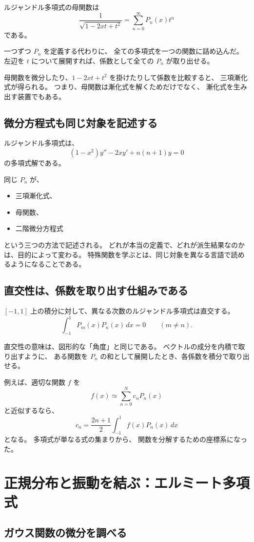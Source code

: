 ルジャンドル多項式の母関数は
\[
  \frac1{\sqrt{1-2xt+t^2}}
  =\sum_{n=0}^{\infty}P_n(x)t^n
\]
である。

一つずつ $P_n$ を定義する代わりに、
全ての多項式を一つの関数に詰め込んだ。
左辺を $t$ について展開すれば、係数として全ての $P_n$ が取り出せる。

母関数を微分したり、$1-2xt+t^2$ を掛けたりして係数を比較すると、
三項漸化式が得られる。
つまり、母関数は漸化式を解くためだけでなく、
漸化式を生み出す装置でもある。

\subsection{微分方程式も同じ対象を記述する}

ルジャンドル多項式は、
\[
  (1-x^2)y''-2xy'+n(n+1)y=0
\]
の多項式解である。

同じ $P_n$ が、
\begin{itemize}
  \item 三項漸化式、
  \item 母関数、
  \item 二階微分方程式
\end{itemize}
という三つの方法で記述される。
どれが本当の定義で、どれが派生結果なのかは、目的によって変わる。
特殊関数を学ぶとは、同じ対象を異なる言語で読めるようになることである。

\subsection{直交性は、係数を取り出す仕組みである}

$[-1,1]$ 上の積分に対して、異なる次数のルジャンドル多項式は直交する。
\[
  \int_{-1}^{1}P_m(x)P_n(x)\,dx=0
  \qquad(m\neq n).
\]

直交性の意味は、図形的な「角度」と同じである。
ベクトルの成分を内積で取り出すように、
ある関数を $P_n$ の和として展開したとき、各係数を積分で取り出せる。

例えば、適切な関数 $f$ を
\[
  f(x)\simeq\sum_{n=0}^{N}c_nP_n(x)
\]
と近似するなら、
\[
  c_n=
  \frac{2n+1}{2}
  \int_{-1}^{1}f(x)P_n(x)\,dx
\]
となる。
多項式が単なる式の集まりから、
関数を分解するための座標系になった。

\section{正規分布と振動を結ぶ：エルミート多項式}

\subsection{ガウス関数の微分を調べる}

